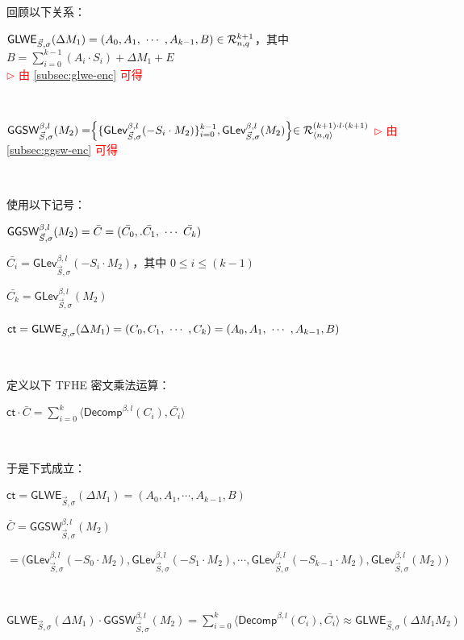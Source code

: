 \noindent 回顾以下关系：

$\textsf{GLWE}_{\vec{S}, \sigma}(\Delta M_1) = (A_0, A_1, \text{ } \text{$\cdots$} \text{ }, A_{k-1}, B) \in \mathcal{R}_{n, q}^{k + 1}$，其中 $B = \sum\limits_{i=0}^{k-1}(A_i \cdot S_i) + \Delta M_1 + E$ \\ \textcolor{red}{ $\rhd$ 由 \autoref{subsec:glwe-enc} 可得}

$ $

$\textsf{GGSW}_{\vec{S}, \sigma}^{\beta, l}(M_2) = \Bigr \{ \{ \textsf{GLev}_{\vec{S}, \sigma}^{\beta, l} (-S_i \cdot M_2)  \}_{i=0}^{k-1}, \textsf{GLev}_{\vec{S}, \sigma}^{\beta, l}(M_2) \Bigl \} \in \mathcal{R}_{\langle n, q \rangle }^{(k+1) \cdot l \cdot (k+1)}$ \textcolor{red}{ $\rhd$ 由 \autoref{subsec:ggsw-enc} 可得}

$ $

\noindent 使用以下记号：

$\textsf{GGSW}_{\vec{S}, \sigma}^{\beta, l}(M_2) = {\bar{C}} = (\bar{C_0},. \bar{C_1}, \text{ } \text{$\cdots$} \text{ } \bar{C_k})$ 

$\bar{C_i} = \textsf{GLev}_{\vec{S}, \sigma}^{\beta, l}(-S_i \cdot M_2)$，其中 $0 \leq i \leq (k-1)$

$\bar{C_k} = \textsf{GLev}_{\vec{S}, \sigma}^{\beta, l}(M_2)$

$\textsf{ct} = \textsf{GLWE}_{\vec{S}, \sigma}(\Delta M_1) = (C_0, C_1, \text{ } \text{$\cdots$} \text{ }, C_k) = (A_0, A_1, \text{ } \text{$\cdots$} \text{ }, A_{k-1}, B)$

$ $

\noindent 定义以下 TFHE 密文乘法运算：

$\textsf{ct} \cdot {\bar{C}} = \sum\limits_{i=0}^{k}\langle \textsf{Decomp}^{\beta, l}(C_i), \bar{C_i} \rangle$

$ $

\noindent 于是下式成立：

\begin{tcolorbox}[title={\textbf{\tboxlabel{\ref*{subsubsec:tfhe-glwe-to-ggsw-multiplication}} 推广到 GLWE 与 GGSW 的乘法}}]
$\textsf{ct} = \textsf{GLWE}_{\vec{S}, \sigma}(\Delta M_1) = (A_0, A_1, \cdots, A_{k-1}, B)$

$\bar{C} = \textsf{GGSW}_{\vec{S}, \sigma}^{\beta, l}(M_2)$

$ = \bm(\textsf{GLev}_{\vec{S}, \sigma}^{\beta, l}(-S_0\cdot M_2), \textsf{GLev}_{\vec{S}, \sigma}^{\beta, l}(-S_1\cdot M_2), \cdots, \textsf{GLev}_{\vec{S}, \sigma}^{\beta, l}(-S_{k-1}\cdot M_2), \textsf{GLev}_{\vec{S}, \sigma}^{\beta, l}(M_2)\bm)$

$ $

$\textsf{GLWE}_{\vec{S}, \sigma}(\Delta M_1) \cdot \textsf{GGSW}_{\vec{S}, \sigma}^{\beta, l}(M_2) = \sum\limits_{i=0}^{k}\langle \textsf{Decomp}^{\beta, l}(C_i), \bar{C_i} \rangle \approx \textsf{GLWE}_{\vec{S}, \sigma}(\Delta M_1 M_2)$
\end{tcolorbox}

